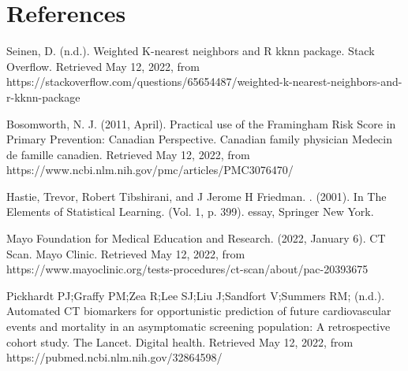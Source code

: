 \documentclass{article}
\begin{document}
\pagebreak

\section{References}

Seinen, D. (n.d.). Weighted K-nearest neighbors and R kknn package. Stack Overflow. Retrieved May 12, 2022, from https://stackoverflow.com/questions/65654487/weighted-k-nearest-neighbors-and-r-kknn-package 


Bosomworth, N. J. (2011, April). Practical use of the Framingham Risk Score in Primary Prevention: Canadian Perspective. Canadian family physician Medecin de famille canadien. Retrieved May 12, 2022, from https://www.ncbi.nlm.nih.gov/pmc/articles/PMC3076470/ 


Hastie, Trevor, Robert Tibshirani, and J Jerome H Friedman. . (2001). In The Elements of Statistical Learning. (Vol. 1, p. 399). essay, Springer New York. 


Mayo Foundation for Medical Education and Research. (2022, January 6). CT Scan. Mayo Clinic. Retrieved May 12, 2022, from https://www.mayoclinic.org/tests-procedures/ct-scan/about/pac-20393675


Pickhardt PJ;Graffy PM;Zea R;Lee SJ;Liu J;Sandfort V;Summers RM; (n.d.). Automated CT biomarkers for opportunistic prediction of future cardiovascular events and mortality in an asymptomatic screening population: A retrospective cohort study. The Lancet. Digital health. Retrieved May 12, 2022, from https://pubmed.ncbi.nlm.nih.gov/32864598/ 
\end{document}
